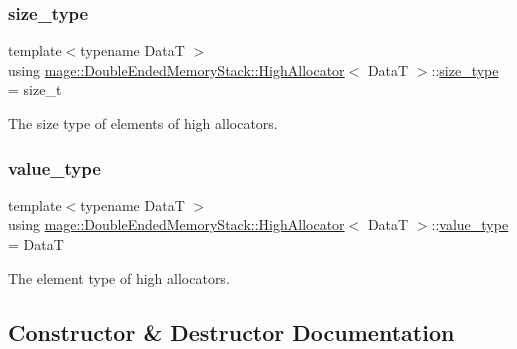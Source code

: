 \subsubsection{\texorpdfstring{size\+\_\+type}{size\_type}}
{\footnotesize\ttfamily template$<$typename DataT $>$ \\
using \hyperlink{structmage_1_1_double_ended_memory_stack_1_1_high_allocator}{mage\+::\+Double\+Ended\+Memory\+Stack\+::\+High\+Allocator}$<$ DataT $>$\+::\hyperlink{structmage_1_1_double_ended_memory_stack_1_1_high_allocator_a0d2e29171c7898850631b1a57a29fe0d}{size\+\_\+type} =  size\+\_\+t}

The size type of elements of high allocators. \hypertarget{structmage_1_1_double_ended_memory_stack_1_1_high_allocator_a43b87cea37b3bbba57ca794e9785e82d}{}\label{structmage_1_1_double_ended_memory_stack_1_1_high_allocator_a43b87cea37b3bbba57ca794e9785e82d} 
\subsubsection{\texorpdfstring{value\+\_\+type}{value\_type}}
{\footnotesize\ttfamily template$<$typename DataT $>$ \\
using \hyperlink{structmage_1_1_double_ended_memory_stack_1_1_high_allocator}{mage\+::\+Double\+Ended\+Memory\+Stack\+::\+High\+Allocator}$<$ DataT $>$\+::\hyperlink{structmage_1_1_double_ended_memory_stack_1_1_high_allocator_a43b87cea37b3bbba57ca794e9785e82d}{value\+\_\+type} =  DataT}

The element type of high allocators. 

\subsection{Constructor \& Destructor Documentation}
\hypertarget{structmage_1_1_double_ended_memory_stack_1_1_high_allocator_aaad727b10738064cffcb555252df5cfd}{}\label{structmage_1_1_double_ended_memory_stack_1_1_high_allocator_aaad727b10738064cffcb555252df5cfd} 
